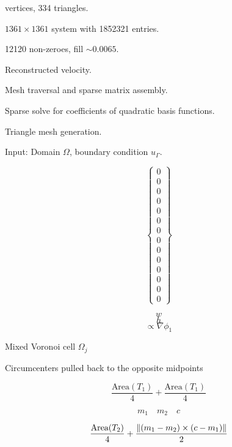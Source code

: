 \documentclass{article}
\begin{document}
 vertices, 334 triangles.

$1361 \times 1361$ system with 1852321 entries.

12120 non-zeroes, fill $\sim 0.0065$.

Reconstructed velocity.

Mesh traversal and sparse matrix assembly.

Sparse solve for coefficients of quadratic basis functions.

Triangle mesh generation.

Input: Domain $\Omega$, boundary condition $u_\Gamma$.


$$
\left\{
\begin{array}{c}
0\\
0\\
0\\
0\\
0\\
0\\
0\\
0\\
0\\
0\\
0\\
0\\
0\\
0
\end{array}
\right\}
$$



$$w$$
$$h$$
$$\propto \nabla \phi_1$$

Mixed Voronoi cell $\Omega_j$

Circumcenters pulled back to the opposite midpoints

$$\frac{\text{Area}(T_1)}{4} + \frac{\text{Area}(T_1)}{4}$$

$$m_1 \quad m_2 \quad c$$

$$\frac{\text{Area}(T_2)}{4} + \frac{\left\Vert(m_1 - m_2)\times (c - m_1)\right\Vert}{2}$$
\end{document}
